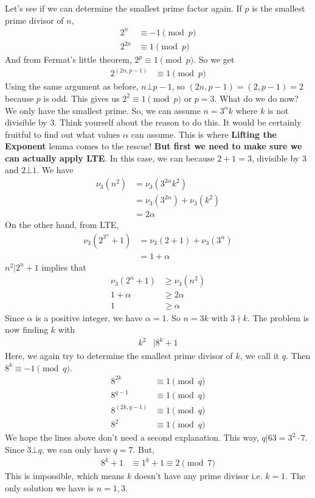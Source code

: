\documentclass[problems.tex]{subfile}
\begin{document}
	\begin{solution}
		Let's see if we can determine the smallest prime factor again. If $p$ is the smallest prime divisor of $n$,
			\begin{align*}
				2^n &\equiv-1\pmod p\\
				2^{2n} &\equiv1\pmod p
			\end{align*}
		And from Fermat's little theorem, $2^p\equiv1\pmod p$. So we get
			\begin{align*}
				2^{(2n,p-1)} &\equiv1\pmod p
			\end{align*}
		Using the same argument as before, $n\bot p-1$, so $(2n,p-1)=(2,p-1)=2$ because $p$ is odd. This gives us $2^2\equiv1\pmod p$ or $p=3$. What do we do now? We only have the smallest prime. So, we can assume $n=3^\alpha k$ where $k$ is not divisible by $3$. Think yourself about the reason to do this. It would be certainly fruitful to find out what values $\alpha$ can assume. This is where \textbf{Lifting the Exponent} lemma comes to the rescue! \textbf{But first we need to make sure we can actually apply LTE}. In this case, we can because $2+1=3$, divisible by $3$ and $2\bot1$. We have
			\begin{align*}
				\nu_3(n^2)  & = \nu_3(3^{2\alpha }k^2)\\
							& = \nu_3(3^{2\alpha })+\nu_3(k^2)\\
							& = 2\alpha 
			\end{align*}
		On the other hand, from LTE,
			\begin{align*}
				\nu_3(2^{3^\alpha}+1)  & = \nu_3(2+1)+\nu_3(3^\alpha )\\
									& = 1+\alpha
			\end{align*}
		$n^2|2^n+1$ implies that 
			\begin{align*}
				\nu_3(2^n+1) & \geq\nu_3(n^2)\\
				1+\alpha & \geq2\alpha\\
				1 & \geq\alpha
			\end{align*}
		Since $\alpha $ is a positive integer, we have $\alpha = 1$. So $n=3k$ with $3\nmid k$. The problem is now finding $k$ with
			\begin{align*}
				k^2 & | 8^k+1
			\end{align*}
		Here, we again try to determine the smallest prime divisor of $k$, we call it $q$. Then $8^k\equiv-1\pmod q$.
			\begin{align*}
				8^{2k} &\equiv1\pmod q\\
				8^{q-1}&\equiv1\pmod q\\
				8^{(2k,q-1)}&\equiv1\pmod q\\
				8^{2}&\equiv1\pmod q
			\end{align*}
		We hope the lines above don't need a second explanation. This way, $q|63=3^2\cdot7$. Since $3\bot q$, we can only have $q=7$. But,
			\begin{align*}
				8^k+1 &\equiv1^k+1\equiv2\pmod7
			\end{align*}
		This is impossible, which means $k$ doesn't have any prime divisor i.e. $k=1$. The only solution we have is $n=1,3$.
	\end{solution}
	
\end{document}

